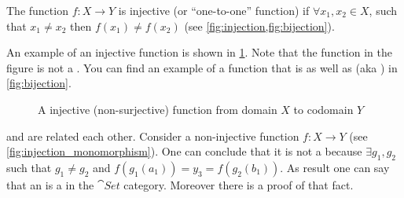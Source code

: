 \begin{definition}[Injection]
  \label{def:injection}
  The function $f: X \rightarrow Y$ is injective (or ``one-to-one'' function) if
  $\forall x_1, x_2 \in X$, such that $x_1 \ne x_2$ then
  $f\left(x_1\right) \ne f\left(x_2\right)$ (see
  \cref{fig:injection,fig:bijection}).  
\end{definition}

\begin{example}[Injection]
An example of an injective function is shown in \cref{fig:injection}.
Note that the function in the figure is not a
. You can find an example of a function that
is  as well as  (aka
) in \cref{fig:bijection}.
\begin{figure}[H]
  \centering
  \caption{A injective (non-surjective) function from domain $X$ to
    codomain $Y$ }
  \label{fig:injection}
\end{figure}
\end{example}

\begin{remark}
  \label{rem:injection_monomorphism}
   and  are
  related each other. Consider a non-injective function $f: X
  \rightarrow Y$ (see \cref{fig:injection_monomorphism}). One can
  conclude that it is not a  because
  $\exists g_1, g_2$ such 
  that $g_1 \ne g_2$ and $f(g_1(a_1)) = y_3 = f(g_2(b_1))$. As result
  one can say that an  is a
   in the $\cat{Set}$ category. Moreover there
  is a proof
  \cite{bib:proofwiki:Injection_iff_Monomorphism_in_Category_of_Sets} 
  of that fact.
\end{remark}

